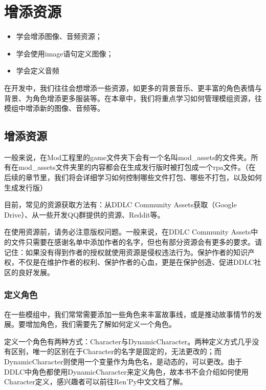 \documentclass[../../Main.tex]{subfiles}
\begin{document}
\chapter{增添资源}
\begin{ChapterGoals}
    \begin{itemize}
        \item 学会增添图像、音频资源；
        \item 学会使用image语句定义图像；
        \item 学会定义音频
    \end{itemize}
\end{ChapterGoals}

在开发中，我们往往会想增添一些资源，如更多的背景音乐、更丰富的角色表情与背景、为角色增添更多服装等。在本章中，我们将重点学习如何管理模组资源，往模组中增添新的图像、音频等。

\section{增添资源}
一般来说，在Mod工程里的game文件夹下会有一个名叫mod\_assets的文件夹。所有在mod\_assets文件夹里的内容都会在生成发行版时被打包成一个rpa文件。（在后续的章节里，我们将会详细学习如何控制哪些文件打包、哪些不打包，以及如何生成发行版）

\begin{ExtraKnowledge}
    目前，常见的资源获取方法有：从DDLC Community Assets获取（Google Drive）、从一些开发QQ群提供的资源、Reddit等。
\end{ExtraKnowledge}

\begin{Attention}
    在使用资源前，请务必注意版权问题。一般来说，在DDLC Community Assets中的文件只需要在感谢名单中添加作者的名字，但也有部分资源会有更多的要求。请记住：如果没有得到作者的授权就使用资源是侵权违法行为。保护作者的知识产权，不仅是在维护作者的权利、保护作者的心血，更是在保护创造、促进DDLC社区的良好发展。
\end{Attention}


\subsection{定义角色}
在一些模组中，我们常常需要添加一些角色来丰富故事线，或是推动故事情节的发展。要增加角色，我们需要先了解如何定义一个角色。

定义一个角色有两种方式：Character与DynamicCharacter。两种定义方式几乎没有区别，唯一的区别在于Character的名字是固定的，无法更改的；而DynamicCharacter则使用一个变量作为角色名，是动态的，可以更改。由于DDLC中角色都使用DynamicCharacter来定义角色，故本书不会介绍如何使用Character定义，感兴趣者可以前往Ren'Py中文文档了解。
\end{document}
